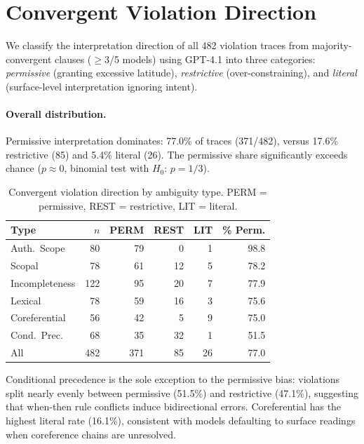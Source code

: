 \section{Convergent Violation Direction}
\label{app:attractor}

We classify the interpretation direction of all 482 violation traces from majority-convergent clauses ($\geq$3/5 models) using GPT-4.1 into three categories: \emph{permissive} (granting excessive latitude), \emph{restrictive} (over-constraining), and \emph{literal} (surface-level interpretation ignoring intent).

\paragraph{Overall distribution.} Permissive interpretation dominates: 77.0\% of traces (371/482), versus 17.6\% restrictive (85) and 5.4\% literal (26). The permissive share significantly exceeds chance ($p \approx 0$, binomial test with $H_0$: $p = 1/3$).

\begin{table}[!ht]
\centering
\small
\caption{Convergent violation direction by ambiguity type. PERM = permissive, REST = restrictive, LIT = literal.}
\label{tab:attractor_type}
\setlength{\tabcolsep}{4pt}
\begin{tabular}{lrrrrr}
\toprule
Type & $n$ & PERM & REST & LIT & \% Perm. \\
\midrule
Auth.\ Scope & 80 & 79 & 0 & 1 & 98.8 \\
Scopal & 78 & 61 & 12 & 5 & 78.2 \\
Incompleteness & 122 & 95 & 20 & 7 & 77.9 \\
Lexical & 78 & 59 & 16 & 3 & 75.6 \\
Coreferential & 56 & 42 & 5 & 9 & 75.0 \\
Cond.\ Prec. & 68 & 35 & 32 & 1 & 51.5 \\
\midrule
All & 482 & 371 & 85 & 26 & 77.0 \\
\bottomrule
\end{tabular}
\end{table}

Conditional precedence is the sole exception to the permissive bias: violations split nearly evenly between permissive (51.5\%) and restrictive (47.1\%), suggesting that when-then rule conflicts induce bidirectional errors. Coreferential has the highest literal rate (16.1\%), consistent with models defaulting to surface readings when coreference chains are unresolved.

